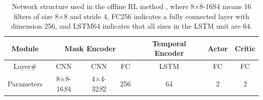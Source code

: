 \begin{table}[ht]
\centering
\caption{Network structure used in the offline RL method \citep{zhong2024empowering}, where 8$\times$8-16S4 means 16 filters of size 8$\times$8 and stride 4, FC256 indicates a fully connected layer with dimension 256, and LSTM64 indicates that all sizes in the LSTM unit are 64. }
\begin{tabular}{c|c|c|c|c|c|c}
\hline\hline
Module & \multicolumn{3}{|c|}{Mask Encoder} & Temporal Encoder & Actor & Critic \\ \hline
Layer\# & CNN & CNN & FC & LSTM & FC & FC\\ \hline
Parameters & 8$\times$8-16\emph{S}4 & 4$\times$4-32\emph{S}2 & 256 & 64 & 2 & 2 \\
\hline
\end{tabular}
\label{offline_tracking_agent}

\end{table}

